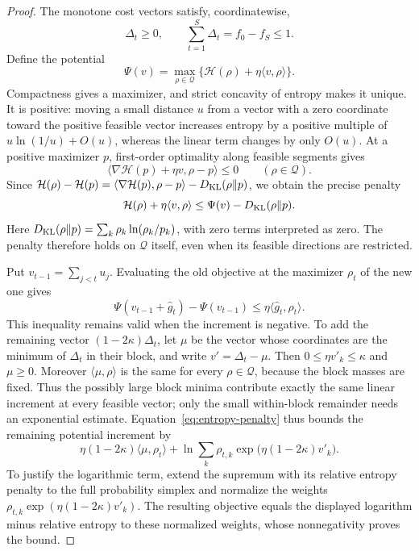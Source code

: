 \begin{proof}
The monotone cost vectors satisfy, coordinatewise,
\begin{equation}\label{eq:increment-properties}
 \Delta_t\ge0,
 \qquad
 \sum_{t=1}^S\Delta_t
 =f_0-f_S\le1.
\end{equation}
Define the potential
\[
 \Psi(v)=\max_{\rho\in\mathcal Q}
 \{\mathcal H(\rho)+\eta\langle v,\rho\rangle\}.
\]
Compactness gives a maximizer, and strict concavity of entropy makes it
unique.  It is positive: moving a small
distance $u$ from a vector with a zero coordinate toward the positive feasible
vector increases entropy by a positive multiple of $u\ln(1/u)+O(u)$,
whereas the linear term changes by only $O(u)$. At a positive maximizer
$p$, first-order optimality along feasible segments gives
\[
 \langle\nabla\mathcal H(p)+\eta v,\rho-p\rangle\le0
 \qquad(\rho\in\mathcal Q).
\]
Since
$\mathcal H(\rho)-\mathcal H(p)
 =\langle\nabla\mathcal H(p),\rho-p\rangle-D_{\mathrm{KL}}(\rho\Vert p)$,
we obtain the precise penalty
\begin{equation}\label{eq:entropy-penalty}
 \mathcal H(\rho)+\eta\langle v,\rho\rangle
 \le \Psi(v)-D_{\mathrm{KL}}(\rho\Vert p).
\end{equation}
Here $D_{\mathrm{KL}}(\rho\Vert p)=\sum_k\rho_k\ln(\rho_k/p_k)$, with zero terms
interpreted as zero. The penalty therefore holds on $\mathcal Q$ itself,
even when its feasible directions are restricted.

Put $v_{t-1}=\sum_{j<t}u_j$.
Evaluating the old objective at the maximizer $\rho_t$ of the new one
gives
\begin{equation}\label{eq:predicted-potential-increment}
 \Psi(v_{t-1}+\widehat g_t)-\Psi(v_{t-1})
 \le\eta\langle\widehat g_t,\rho_t\rangle.
\end{equation}
This inequality remains valid when the increment is negative.
To add the remaining vector $(1-2\kappa)\Delta_t$, let $\mu$ be the
vector whose coordinates are the minimum of $\Delta_t$ in their
block, and write $v'=\Delta_t-\mu$. Then
$0\le\eta v'_k\le\kappa$ and $\mu\ge0$.
Moreover $\langle\mu,\rho\rangle$ is the same for every
$\rho\in\mathcal Q$, because the block masses are fixed.
Thus the possibly large block minima contribute exactly the same linear
increment at every feasible vector; only the small within-block remainder
needs an exponential estimate.
Equation~\ref{eq:entropy-penalty} thus bounds the remaining potential
increment by
\begin{equation}\label{eq:innovation-potential-increment}
 \eta(1-2\kappa)\langle\mu,\rho_t\rangle
 +\ln\sum_k\rho_{t,k}
       \exp\bigl(\eta(1-2\kappa)v'_k\bigr).
\end{equation}
To justify the logarithmic term, extend the supremum with its relative
entropy penalty to the full probability simplex and normalize the weights
$\rho_{t,k}\exp(\eta(1-2\kappa)v'_k)$.
The resulting objective equals the displayed logarithm minus relative
entropy to these normalized weights, whose nonnegativity proves the bound.


\end{proof}
